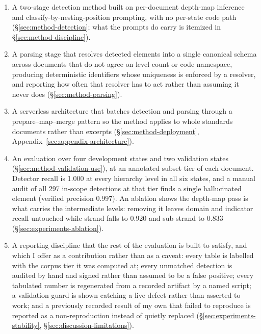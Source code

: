 \begin{enumerate}
  \item A two-stage detection method built on per-document depth-map inference
    and classify-by-nesting-position prompting, with no per-state code path
    (\S\ref{sec:method-detection}; what the prompts do carry is itemized in
    \S\ref{sec:method-discipline}).
  \item A parsing stage that resolves detected elements into a single canonical
    schema across documents that do not agree on level count or code namespace,
    producing deterministic identifiers whose uniqueness is enforced by a
    resolver, and reporting how often that resolver has to act rather than
    assuming it never does (\S\ref{sec:method-parsing}).
  \item A serverless architecture that batches detection and parsing through a
    prepare--map--merge pattern so the method applies to whole standards
    documents rather than excerpts (\S\ref{sec:method-deployment},
    Appendix~\ref{sec:appendix-architecture}).
  \item An evaluation over four development states and two validation states
    (\S\ref{sec:method-validation-use}), at an annotated subset tier of each
    document. Detector recall is 1.000 at every
    hierarchy level in all six states, and a manual audit of all 297 in-scope
    detections at that tier finds a single hallucinated element (verified
    precision 0.997). An ablation shows the depth-map pass is what carries the
    intermediate levels: removing it leaves domain and indicator recall
    untouched while strand falls to 0.920 and sub-strand to 0.833
    (\S\ref{sec:experiments-ablation}).
  \item A reporting discipline that the rest of the evaluation is built to
    satisfy, and which I offer as a contribution rather than as a caveat: every
    table is labelled with the corpus tier it was computed at; every unmatched
    detection is audited by hand and signed rather than assumed to be a false
    positive; every tabulated number is regenerated from a recorded artifact by a named
    script; a validation guard is shown catching a live defect rather than
    asserted to work; and a previously recorded result of my own that failed to
    reproduce is reported as a non-reproduction instead of quietly replaced
    (\S\ref{sec:experiments-stability}, \S\ref{sec:discussion-limitations}).
\end{enumerate}

